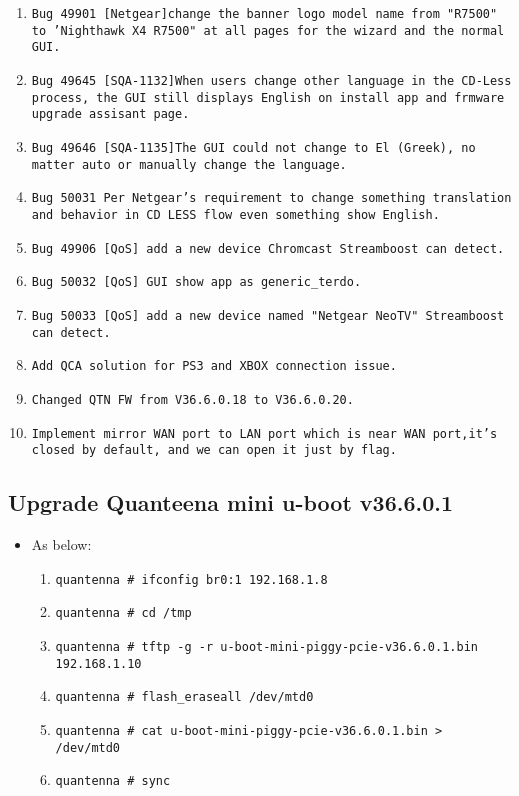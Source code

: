 \documentclass[12pt]{report}
\begin{document}
\begin{itemize}
\begin{enumerate}
		\item \texttt{Bug 49901 [Netgear]change the banner logo model name from "R7500" to 'Nighthawk X4 R7500" at all pages for the wizard and the normal GUI.}
		\item \texttt{Bug 49645 [SQA-1132]When users change other language in the CD-Less process, the GUI still displays English on install app and frmware upgrade assisant page.}
		\item \texttt{Bug 49646 [SQA-1135]The GUI could not change to El (Greek), no matter auto or manually change the language.}
		\item \texttt{Bug 50031 Per Netgear's requirement to change something translation and behavior in CD LESS flow even something show English.}
		\item \texttt{Bug 49906 [QoS] add a new device Chromcast Streamboost can detect.}
		\item \texttt{Bug 50032 [QoS] GUI show app as generic\_terdo.}
		\item \texttt{Bug 50033 [QoS] add a new device named "Netgear NeoTV" Streamboost can detect.}
		\item \texttt{Add QCA solution for PS3 and XBOX connection issue.}
		\item \texttt{Changed QTN FW from V36.6.0.18 to V36.6.0.20.}
		\item \texttt{Implement mirror WAN port to LAN port which is near WAN port,it's closed by default, and we can open it just by flag.}

    	\end{enumerate}
    \end{itemize}

    \subsection{Upgrade Quanteena mini u-boot v36.6.0.1}
    \begin{itemize}
    \item As below:
    	\begin{enumerate}
		\item \texttt{quantenna \# ifconfig br0:1 192.168.1.8}
		\item \texttt{quantenna \# cd /tmp}
		\item \texttt{quantenna \# tftp -g -r u-boot-mini-piggy-pcie-v36.6.0.1.bin 192.168.1.10}
		\item \texttt{quantenna \# flash\_eraseall /dev/mtd0}
		\item \texttt{quantenna \# cat u-boot-mini-piggy-pcie-v36.6.0.1.bin > /dev/mtd0}
		\item \texttt{quantenna \# sync}
    	\end{enumerate}
    \end{itemize}
\end{document}
